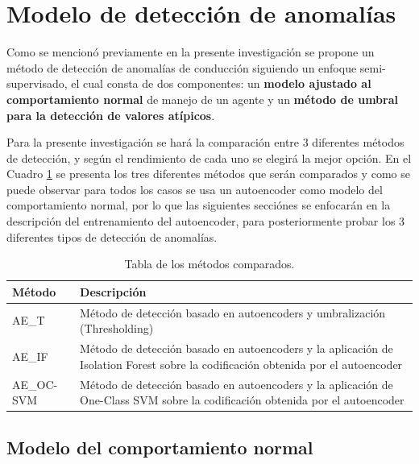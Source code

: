 \section{Modelo de detecci\'{o}n de anomal\'{i}as}

Como se mencion\'{o} previamente en la presente investigaci\'{o}n se propone un m\'{e}todo de detecci\'{o}n de anomal\'{i}as de conducci\'{o}n siguiendo un enfoque semi-supervisado, el cual consta de dos componentes: un \textbf{modelo ajustado al comportamiento normal} de manejo de un agente y un \textbf{m\'{e}todo de umbral para la detecci\'{o}n de valores at\'{i}picos}.

\vspace{5mm} %

Para la presente investigaci\'{o}n se har\'{a} la comparaci\'{o}n entre 3 diferentes m\'{e}todos de detecci\'{o}n, y seg\'{u}n el rendimiento de cada uno se elegir\'{a} la mejor opci\'{o}n. En el Cuadro \ref{table:metodos_comparados} se presenta los tres diferentes m\'{e}todos que ser\'{a}n comparados y como se puede observar para todos los casos se usa un autoencoder como modelo del comportamiento normal, por lo que las siguientes secci\'{o}nes se enfocar\'{a}n en la descripci\'{o}n del entrenamiento del autoencoder, para posteriormente probar los 3 diferentes tipos de detecci\'{o}n de anomal\'{i}as.

\begin{table}[H]
\centering
\begin{tabular}{|l|p{100mm}|}
\hline
\textbf{M\'{e}todo} & \textbf{Descripci\'{o}n} \\ \hline
AE\_T & M\'{e}todo de detecci\'{o}n basado en autoencoders y umbralizaci\'{o}n (Thresholding) \\ \hline
AE\_IF & M\'{e}todo de detecci\'{o}n basado en autoencoders y la aplicaci\'{o}n de Isolation Forest sobre la codificaci\'{o}n obtenida por el autoencoder  \\ \hline
AE\_OC-SVM & M\'{e}todo de detecci\'{o}n basado en autoencoders y la aplicaci\'{o}n de One-Class SVM sobre la codificaci\'{o}n obtenida por el autoencoder \\ \hline
\end{tabular}
\caption{Tabla de los m\'{e}todos comparados.}
\label{table:metodos_comparados}
\end{table}

\subsection{Modelo del comportamiento normal}

